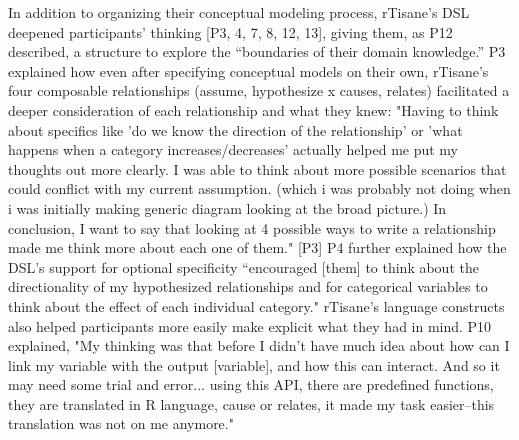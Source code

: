 In addition to organizing their conceptual modeling process, rTisane’s DSL
deepened participants’ thinking [P3, 4, 7, 8, 12, 13], giving them, as P12
described, a structure to explore the “boundaries of their domain knowledge.” P3
explained how even after specifying conceptual models on their own, rTisane’s
four composable relationships (assume, hypothesize x causes, relates)
facilitated a deeper consideration of each relationship and what they knew:
"Having to think about specifics like 'do we know the direction of the
relationship' or 'what happens when a category increases/decreases' actually
helped me put my thoughts out more clearly. I was able to think about more
possible scenarios that could conflict with my current assumption. (which i was
probably not doing when i was initially making generic diagram looking at the
broad picture.) In conclusion, I want to say that looking at 4 possible ways to
write a relationship made me think more about each one of them." [P3] P4 further
explained how the DSL’s support for optional specificity “encouraged [them] to
think about the directionality of my hypothesized relationships and for
categorical variables to think about the effect of each individual category."
rTisane’s language constructs also helped participants more easily make explicit
what they had in mind. P10 explained, "My thinking was that before I didn’t have
much idea about how can I link my variable with the output [variable], and how
this can interact. And so it may need some trial and error... using this API,
there are predefined functions, they are translated in R language, cause or
relates, it made my task easier–this translation was not on me anymore."

